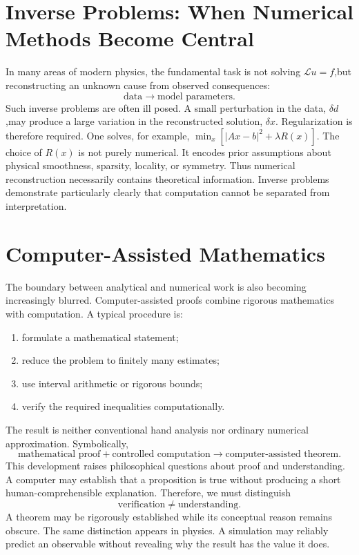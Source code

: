 \section{Inverse Problems: When Numerical Methods Become Central}
In many areas of modern physics, the fundamental task is not solving
$\mathcal{L}u=f$,but reconstructing an unknown cause from observed consequences:
\[\text{data}\rightarrow\text{model parameters}.\]
Such inverse problems are often ill posed.
A small perturbation in the data,
$\delta d$,may produce a large variation in the reconstructed solution,
$\delta x$.
Regularization is therefore required.
One solves, for example,
$\min_x\left[|Ax-b|^2+\lambda R(x)\right]$.
The choice of $R(x)$ is not purely numerical. It encodes prior assumptions
about physical smoothness, sparsity, locality, or symmetry.
Thus numerical reconstruction necessarily contains theoretical information.
Inverse problems demonstrate particularly clearly that computation cannot be
separated from interpretation.

\section{ Computer-Assisted Mathematics}
The boundary between analytical and numerical work is also becoming increasingly blurred.
Computer-assisted proofs combine rigorous mathematics with computation.
A typical procedure is:
\begin{enumerate}
\item formulate a mathematical statement;
\item reduce the problem to finitely many estimates;
\item use interval arithmetic or rigorous bounds;
\item verify the required inequalities computationally.
\end{enumerate}
The result is neither conventional hand analysis nor ordinary numerical approximation.
Symbolically,
\[
\text{mathematical proof}
+
\text{controlled computation}
\rightarrow
\text{computer-assisted theorem}.
\]
This development raises philosophical questions about proof and understanding.
A computer may establish that a proposition is true without producing a short
human-comprehensible explanation.
Therefore, we must distinguish
\[\text{verification}\neq\text{understanding}.\]
A theorem may be rigorously established while its conceptual reason remains obscure.
The same distinction appears in physics.
A simulation may reliably predict an observable without revealing why the 
result has the value it does.

